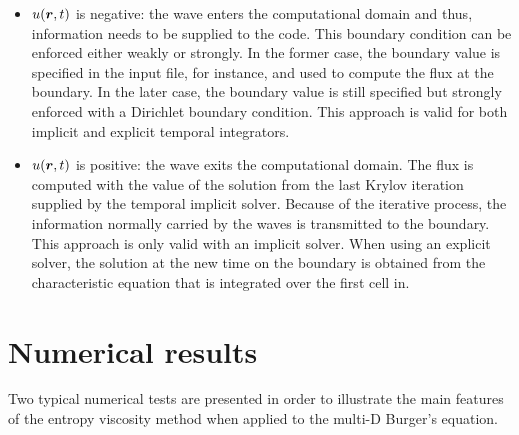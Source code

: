 \begin{itemize}
\item $u(\boldsymbol r,t) $ is negative: the wave enters the computational domain and thus, information needs to be supplied to the code. This boundary condition can be enforced either weakly or strongly. In the former case, the boundary value is specified in the input file, for instance, and used to compute the flux at the boundary. In the later case, the boundary value is still specified but strongly enforced with a Dirichlet boundary condition. This approach is valid for both implicit and explicit temporal integrators.
\item $u(\boldsymbol r,t) $ is positive: the wave exits the computational domain. The flux is computed with the value of the solution from the last Krylov iteration supplied by the temporal implicit solver. Because of the iterative process, the information normally carried by the waves is transmitted to the boundary. This approach is only valid with an implicit solver. When using an explicit solver, the solution at the new time on the boundary is obtained from the characteristic equation that is integrated over the first cell in.
\end{itemize}

\section{Numerical results}\label{sec:num_sct2b}
Two typical numerical tests are presented in order to illustrate the main features of the entropy viscosity method when applied to the multi-D Burger's equation.
